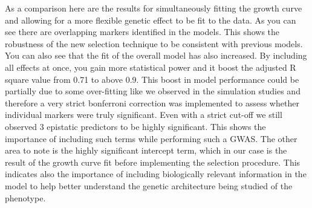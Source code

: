 \documentclass[11pt,]{book}
\theoremstyle{definition}
\theoremstyle{definition}
\theoremstyle{remark}
\begin{document}
As a comparison here are the results for simultaneously fitting the
growth curve and allowing for a more flexible genetic effect to be fit
to the data. As you can see there are overlapping markers identified in
the models. This shows the robustness of the new selection technique to
be consistent with previous models. You can also see that the fit of the
overall model has also increased. By including all effects at once, you
gain more statistical power and it boost the adjusted R square value
from 0.71 to above 0.9. This boost in model performance could be
partially due to some over-fitting like we observed in the simulation
studies and therefore a very strict bonferroni correction was
implemented to assess whether individual markers were truly significant.
Even with a strict cut-off we still observed 3 epistatic predictors to
be highly significant. This shows the importance of including such terms
while performing such a GWAS. The other area to note is the highly
significant intercept term, which in our case is the result of the
growth curve fit before implementing the selection procedure. This
indicates also the importance of including biologically relevant
information in the model to help better understand the genetic
architecture being studied of the phenotype.
\end{document}
